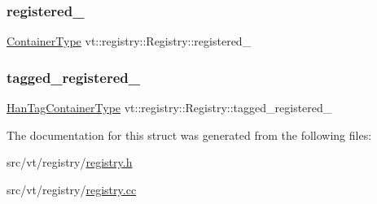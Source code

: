 \mbox{\label{structvt_1_1registry_1_1_registry_adb3e36c663839801759d6bd264b8c4b5}} 
\subsubsection{\texorpdfstring{registered\+\_\+}{registered\_}}
{\footnotesize\ttfamily \hyperlink{structvt_1_1registry_1_1_registry_ac9e1297d26b6c553ccdaa46858cdb3b8}{Container\+Type} vt\+::registry\+::\+Registry\+::registered\+\_\+\hspace{0.3cm}{\ttfamily [private]}}

\mbox{\label{structvt_1_1registry_1_1_registry_ad7d3a1810876242414c29c24db82bb6c}} 
\subsubsection{\texorpdfstring{tagged\+\_\+registered\+\_\+}{tagged\_registered\_}}
{\footnotesize\ttfamily \hyperlink{structvt_1_1registry_1_1_registry_ab5d336044aee749d39c8feabe4fa6983}{Han\+Tag\+Container\+Type} vt\+::registry\+::\+Registry\+::tagged\+\_\+registered\+\_\+\hspace{0.3cm}{\ttfamily [private]}}



The documentation for this struct was generated from the following files\+:\begin{DoxyCompactItemize}
\item 
src/vt/registry/\hyperlink{registry_2registry_8h}{registry.\+h}\item 
src/vt/registry/\hyperlink{registry_8cc}{registry.\+cc}\end{DoxyCompactItemize}
